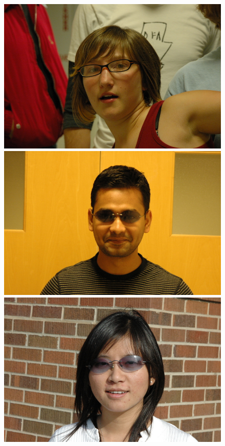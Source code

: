 \begin{figure}
\includegraphics[scale=0.35,clip=true]{figures_cvpr/examples/2/DSC_1874.jpg} \\
\includegraphics[scale=0.35,clip=true]{figures_cvpr/examples/3/DSC_1572.jpg} 
\includegraphics[scale=0.35,clip=true]{figures_cvpr/examples/3/DSC_1587.jpg} 

\end{figure}
